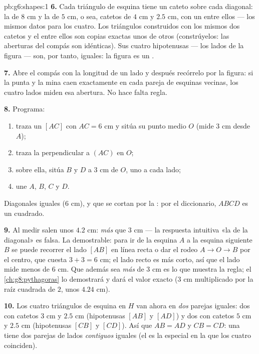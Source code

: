 \begin{solution}{pb:g6:shapes:1}
\textbf{6.} Cada triángulo de esquina tiene un cateto sobre cada
diagonal: la  de $8$ cm y la  de $5$ cm, o sea, catetos de $4$ cm
y $2.5$ cm, con un  entre ellos --- los mismos datos
para los cuatro. Los triángulos construidos con los mismos dos catetos y el
 entre ellos son copias exactas unos de otros
(constrúyelos: las aberturas del compás son idénticas). Sus cuatro
hipotenusas --- los lados de la figura --- son, por tanto, iguales:
la figura es un .

\textbf{7.} Abre el compás con la longitud de un lado y después
recórrelo por la figura: si la punta y la mina caen exactamente
en cada pareja de esquinas vecinas, los cuatro lados miden esa
abertura. No hace falta regla.

\textbf{8.} Programa:
\begin{enumerate}
  \item traza un  $[AC]$ con $AC = 6$ cm y sitúa su
        punto medio $O$ (mide $3$ cm desde $A$);
  \item traza la perpendicular a $(AC)$ en $O$;
  \item sobre ella, sitúa $B$ y $D$ a $3$ cm de $O$, uno a cada
        lado;
  \item une $A$, $B$, $C$ y $D$.
\end{enumerate}
Diagonales iguales ($6$ cm),  y que se cortan por la :
por el diccionario, $ABCD$ es un cuadrado.

\textbf{9.} Al medir salen unos $4.2$ cm: \emph{más} que
$3$ cm --- la respuesta intuitiva «la  de la diagonal» es falsa. La
 demostrable: para ir de la esquina $A$ a la esquina siguiente $B$ se
puede recorrer el lado $[AB]$ en línea recta o dar el rodeo
$A \to O \to B$ por el centro, que cuesta $3 + 3 = 6$ cm; el
lado recto es más corto, así que el lado mide menos de $6$ cm.
Que además sea \emph{más} de $3$ cm es lo que muestra la regla;
el \cref{ch:g8:pythagoras} lo demostrará y dará el valor exacto
($3$ cm multiplicado por la raíz cuadrada de $2$, unos $4.24$ cm).

\textbf{10.} Los cuatro triángulos de esquina en $H$ van ahora en
\emph{dos} parejas iguales: dos con catetos $3$ cm y $2.5$ cm
(hipotenusas $[AB]$ y $[AD]$) y dos con catetos $5$ cm y
$2.5$ cm (hipotenusas $[CB]$ y $[CD]$). Así que $AB = AD$ y
$CB = CD$: una  tiene dos parejas de lados \emph{contiguos}
iguales (el  es la  especial en la que los cuatro coinciden).


\end{solution}
